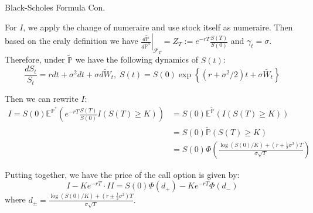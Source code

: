 \documentclass{beamer}
\begin{document}
\begin{frame}{Black-Scholes Formula Con.}

    {\footnotesize \footnotesize
    \par For $I$, we apply the change of numeraire and use stock itself as numeraire. Then based on the eraly definition
    we have $\left.\frac{d\tilde{\mathbb{P}}}{d\mathbb{P}^*}\right|_{\mathcal{F}_T} = Z_T :=  e^{-rT}\frac{S(T)}{S(0)}$
    and $\gamma_t = \sigma$. Therefore, under \(\tilde{\mathbb{P}}\) we have the following dynamics of \(S(t)\):
    \[
    \frac{dS_t}{S_t} = rdt + \sigma^2 dt + \sigma \tilde{dW_t},\;
    S(t) = S(0) \exp \left\{ (r + \sigma^2/2) t + \sigma \tilde{W_t} \right\}
    \]\pause
    \par Then we can rewrite $I$:
    \begin{align*}
        I = S(0)\mathbb{E}^{\mathbb{P}^*} \left( e^{-rT} \frac{S(T)}{S(0)} I(S(T) \geq K) \right) &= S(0) \mathbb{E}^{\tilde{\mathbb{P}}} (I(S(T) \geq K)) \\
        &= S(0) \tilde{\mathbb{P}}(S(T) \geq K)\\
       & = S(0) \Phi \left( \frac{\log(S(0)/K) + (r + \frac{1}{2} \sigma^2) T}{\sigma \sqrt{T}} \right)
    \end{align*}\pause
   \par Putting together, we have the price of the call option is given by:
    \[
    I - Ke^{-rT} \cdot II = S(0) \Phi(d_+) - Ke^{-rT} \Phi(d_-)
    \]
where $d_{\pm} = \frac{\log(S(0)/K) + (r \pm \frac{1}{2} \sigma^2) T}{\sigma \sqrt{T}}.$

    }
\end{frame}
\end{document}
